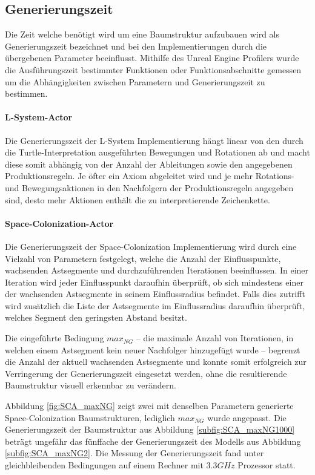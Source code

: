 \subsection{Generierungszeit}

Die Zeit welche benötigt wird um eine Baumstruktur aufzubauen wird als Generierungszeit bezeichnet und bei den Implementierungen durch die übergebenen Parameter beeinflusst. Mithilfe des Unreal Engine Profilers wurde die Ausführungszeit bestimmter Funktionen oder Funktionsabschnitte gemessen um die Abhängigkeiten zwischen Parametern und Generierungszeit zu bestimmen. \cite{Profiling:15}

\paragraph{L-System-Actor}

Die Generierungszeit der L-System Implementierung hängt linear von den durch die Turtle-Interpretation ausgeführten Bewegungen und Rotationen ab und macht diese somit abhängig von der Anzahl der Ableitungen sowie den angegebenen Produktionsregeln. Je öfter ein Axiom abgeleitet wird und je mehr Rotations- und Bewegungsaktionen in den Nachfolgern der Produktionsregeln angegeben sind, desto mehr Aktionen enthält die zu interpretierende Zeichenkette. 

\paragraph{Space-Colonization-Actor}

Die Generierungszeit der Space-Colonization Implementierung wird durch eine Vielzahl von Parametern festgelegt, welche die Anzahl der Einflusspunkte, wachsenden Astsegmente und durchzuführenden Iterationen beeinflussen. In einer Iteration wird jeder Einflusspunkt daraufhin überprüft, ob sich mindestens einer der wachsenden Astsegmente in seinem Einflussradius befindet. Falls dies zutrifft wird zusätzlich die Liste der Astsegmente im Einflussradius daraufhin überprüft, welches Segment den geringsten Abstand besitzt.

Die eingeführte Bedingung $max_{NG}$ -- die maximale Anzahl von Iterationen, in welchen einem Astsegment kein neuer Nachfolger hinzugefügt wurde -- begrenzt die Anzahl der aktuell wachsenden Astsegmente und konnte somit erfolgreich zur Verringerung der Generierungszeit eingesetzt werden, ohne die resultierende Baumstruktur visuell erkennbar zu verändern. 

Abbildung \ref{fig:SCA_maxNG} zeigt zwei mit denselben Parametern generierte Space-Colo\-ni\-za\-tion Baumstrukturen, lediglich $max_{NG}$ wurde angepasst. Die Generierungszeit der Baumstruktur aus Abbildung \ref{subfig:SCA_maxNG1000} beträgt ungefähr das fünffache der Generierungszeit des Modells aus Abbildung \ref{subfig:SCA_maxNG2}. Die Messung der Generierungszeit fand unter gleichbleibenden Bedingungen auf einem Rechner mit $3.3GHz$ Prozessor statt. 

